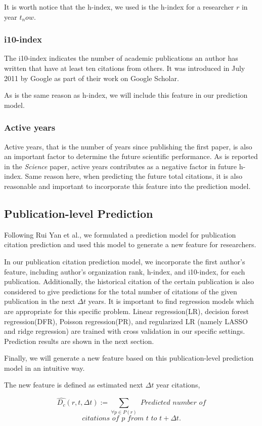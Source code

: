 It is worth notice that the h-index, we used is the h-index for a researcher $r$ in year $t_now$.
\subsubsection{i10-index}
The i10-index indicates the number of academic publications an author has written that have at least ten citations from others.
It was introduced in July 2011 by Google as part of their work on Google Scholar.\cite{delgado2014google}

As is the same reason as h-index, we will include this feature in our prediction model.
\subsubsection{Active years}
Active years, that is the number of years since publishing the first paper, is also an important factor to determine the future scientific performance.
As is reported in the {\it Science} paper\cite{acuna2012future}, active years contributes as a negative factor in future h-index.
Same reason here, when predicting the future total citations, it is also reasonable and important to incorporate this feature into the prediction model.

\subsection{Publication-level Prediction}
Following Rui Yan et al., we formulated a prediction model for publication citation prediction and used this model to generate a new feature for researchers.

In our publication citation prediction model, we incorporate the first author's feature, including author's organization rank, h-index, and i10-index, for each publication.
Additionally, the historical citation of the certain publication is also considered to give predictions for the total number of citations of the given publication in the next $\Delta t$ years.
It is important to find regression models which are appropriate for this specific problem.
Linear regression(LR), decision forest regression(DFR), Poisson regression(PR), and regularized LR (namely LASSO and ridge regression) are trained with cross validation in our specific settings.
Prediction results are shown in the next section.

Finally, we will generate a new feature based on this publication-level prediction model in an intuitive way.

\begin{definition}
The new feature is defined as estimated next $\Delta t$ year citations,

\[\hat{D_c}(r,t,\Delta t):=\sum_{\forall p \in P(r)} \textit{ Predicted number of}\]
\[\textit{citations of } p \textit{ from } t \textit{ to } t+\Delta t.\]
\end{definition}
